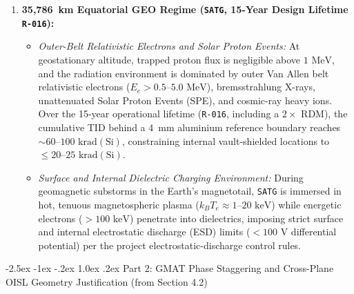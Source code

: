 \documentclass[11pt,a4paper]{article}
\makeatletter
\renewcommand\subsection{\@startsection{subsection}{2}{\z@}%
    {-2.5ex \@plus -1ex \@minus -.2ex}%
    {1.0ex \@plus .2ex}%
    {\normalfont\large\bfseries\sffamily\color{SubHeadingBlue}}}
\providecommand{\abbr}[1]{#1}
\makeatother
\begin{document}
\begin{enumerate}
\begin{itemize}
    \end{itemize}
    \item \textbf{35,786~km Equatorial \abbr{GEO} Regime (\texttt{SATG}, 15-Year Design Lifetime \texttt{R-016}):}
    \begin{itemize}
        \item \emph{Outer-Belt Relativistic Electrons and Solar Proton Events:} At geostationary altitude, trapped proton flux is negligible above $1\text{ MeV}$, and the radiation environment is dominated by outer Van Allen belt relativistic electrons ($E_e > 0.5\text{--}5.0\text{ MeV}$), bremsstrahlung X-rays, unattenuated Solar Proton Events (\abbr{SPE}), and cosmic-ray heavy ions. Over the 15-year operational lifetime (\texttt{R-016}, including a $2\times$ \abbr{RDM}), the cumulative \abbr{TID} behind a 4~mm aluminium reference boundary reaches $\sim 60\text{--}100\text{ krad}(\mathrm{Si})$, constraining internal vault-shielded locations to $\le 20\text{--}25\text{ krad}(\mathrm{Si})$.
        \item \emph{Surface and Internal Dielectric Charging Environment:} During geomagnetic substorms in the Earth's magnetotail, \texttt{SATG} is immersed in hot, tenuous magnetospheric plasma ($k_B T_e \approx 1\text{--}20\text{ keV}$) while energetic electrons ($> 100\text{ keV}$) penetrate into dielectrics, imposing strict surface and internal electrostatic discharge (\abbr{ESD}) limits ($< 100\text{ V}$ differential potential) per the project electrostatic-discharge control rules.
    \end{itemize}
\end{enumerate}

\subsection{Part 2: GMAT Phase Staggering and Cross-Plane OISL Geometry Justification (from Section 4.2)}
\end{document}
